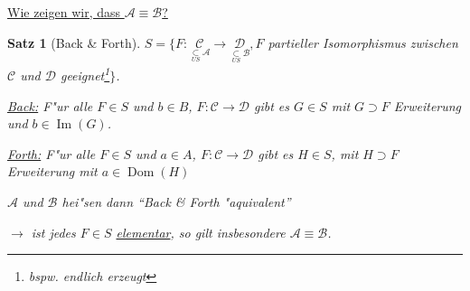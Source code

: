 \documentclass[a4paper,12pt,numbers=noenddot,parskip=full]{scrartcl}
\newcommand{\scrA}{\mathcal{A}}
\newcommand{\scrB}{\mathcal{B}}
\newcommand{\scrC}{\mathcal{C}}
\newcommand{\scrD}{\mathcal{D}}
\DeclareMathOperator{\im}{Im}
\DeclareMathOperator{\dom}{Dom}
\theoremstyle{dotless}
\newtheorem{theorem}{Satz}[section]
\theoremstyle{remark}
\begin{document}
\underline{Wie zeigen wir, dass $\scrA \equiv \scrB$?}
\begin{theorem}[Back \& Forth]
	$S = \{F: \underset{\underset{US}{\subset} \scrA}{\scrC} \longrightarrow \underset{\underset{US}{\subset} \scrB}{\scrD}, F$ partieller Isomorphismus zwischen $\scrC$ und $\scrD$ geeignet\footnote{bspw. endlich erzeugt}$\}$.
	
	\underline{Back:} F"ur alle $F \in S$ und $b \in B$, $F:\scrC \longrightarrow \scrD$ gibt es $G \in S$ mit $G \supset F$ Erweiterung und $b \in \im (G)$.
	
	\underline{Forth:} F"ur alle $F \in S$ und $a \in A$, $F: \scrC \longrightarrow \scrD$ gibt es $H \in S$, mit $H \supset F$ Erweiterung mit $a \in \dom (H)$
	
	$\scrA$ und $\scrB$ hei"sen dann "`Back \& Forth "aquivalent"'
	
	$\rightarrow$ ist jedes $F \in S$ \underline{elementar}, so gilt insbesondere $\scrA \equiv \scrB$.
\end{theorem}

\end{document}
